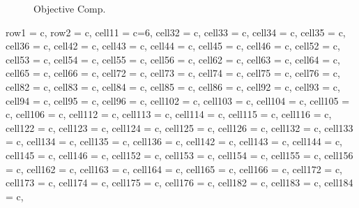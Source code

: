 \begin{figure}[H]
\hspace{0.4cm}%
\vspace{0.4cm}
\caption{Objective Comp.}
\label{Obj_Comp}
\end{figure}


\begin{small}
\begin{longtblr}[
  caption = {Objective Values Comparison},
]{
  row{1} = {c},
  row{2} = {c},
  cell{1}{1} = {c=6}{},
  cell{3}{2} = {c},
  cell{3}{3} = {c},
  cell{3}{4} = {c},
  cell{3}{5} = {c},
  cell{3}{6} = {c},
  cell{4}{2} = {c},
  cell{4}{3} = {c},
  cell{4}{4} = {c},
  cell{4}{5} = {c},
  cell{4}{6} = {c},
  cell{5}{2} = {c},
  cell{5}{3} = {c},
  cell{5}{4} = {c},
  cell{5}{5} = {c},
  cell{5}{6} = {c},
  cell{6}{2} = {c},
  cell{6}{3} = {c},
  cell{6}{4} = {c},
  cell{6}{5} = {c},
  cell{6}{6} = {c},
  cell{7}{2} = {c},
  cell{7}{3} = {c},
  cell{7}{4} = {c},
  cell{7}{5} = {c},
  cell{7}{6} = {c},
  cell{8}{2} = {c},
  cell{8}{3} = {c},
  cell{8}{4} = {c},
  cell{8}{5} = {c},
  cell{8}{6} = {c},
  cell{9}{2} = {c},
  cell{9}{3} = {c},
  cell{9}{4} = {c},
  cell{9}{5} = {c},
  cell{9}{6} = {c},
  cell{10}{2} = {c},
  cell{10}{3} = {c},
  cell{10}{4} = {c},
  cell{10}{5} = {c},
  cell{10}{6} = {c},
  cell{11}{2} = {c},
  cell{11}{3} = {c},
  cell{11}{4} = {c},
  cell{11}{5} = {c},
  cell{11}{6} = {c},
  cell{12}{2} = {c},
  cell{12}{3} = {c},
  cell{12}{4} = {c},
  cell{12}{5} = {c},
  cell{12}{6} = {c},
  cell{13}{2} = {c},
  cell{13}{3} = {c},
  cell{13}{4} = {c},
  cell{13}{5} = {c},
  cell{13}{6} = {c},
  cell{14}{2} = {c},
  cell{14}{3} = {c},
  cell{14}{4} = {c},
  cell{14}{5} = {c},
  cell{14}{6} = {c},
  cell{15}{2} = {c},
  cell{15}{3} = {c},
  cell{15}{4} = {c},
  cell{15}{5} = {c},
  cell{15}{6} = {c},
  cell{16}{2} = {c},
  cell{16}{3} = {c},
  cell{16}{4} = {c},
  cell{16}{5} = {c},
  cell{16}{6} = {c},
  cell{17}{2} = {c},
  cell{17}{3} = {c},
  cell{17}{4} = {c},
  cell{17}{5} = {c},
  cell{17}{6} = {c},
  cell{18}{2} = {c},
  cell{18}{3} = {c},
  cell{18}{4} = {c},
}
\end{longtblr}
\end{small}
